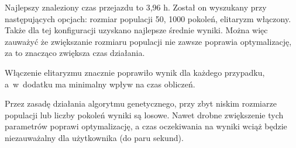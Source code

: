 Najlepszy znaleziony czas przejazdu to 3,96 h. Został on wyszukany przy następujących opcjach: rozmiar populacji 50, 1000 pokoleń, elitaryzm włączony. Także dla tej konfiguracji uzyskano najlepsze średnie wyniki. Można więc zauważyć że zwiększanie rozmiaru populacji nie zawsze poprawia optymalizację, za to znacząco zwiększa czas działania.

Włączenie elitaryzmu znacznie poprawiło wynik dla każdego przypadku, a~w~dodatku ma minimalny wpływ na czas obliczeń.

Przez zasadę działania algorytmu genetycznego, przy zbyt niskim rozmiarze populacji lub liczby pokoleń wyniki są losowe. Nawet drobne zwiększenie tych parametrów poprawi optymalizację, a czas oczekiwania na wyniki wciąż będzie niezauważalny dla użytkownika (do paru sekund).